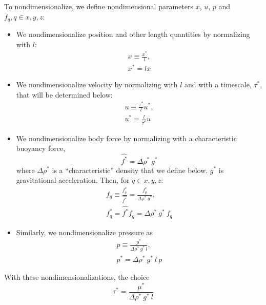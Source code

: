 \documentclass[10pt,a4paper]{article}
\def\non{\nonumber}
\def\l{\mathit{l}}
\begin{document}
To nondimensionalize, we define nondimensional parameters $x$, $u$, $p$ and $f_q, q \in x, y, z$:
\begin{itemize}
	\item We nondimensionalize position and other length quantities by normalizing with $l$:
	\begin{eqnarray}
		x \equiv \frac{x^*}{\mathit{l}} , \non \\
		x^* = \mathit{l} x 
	\end{eqnarray} 
	\item We nondimensionalize velocity by normalizing with $l$ and with a timescale, $\tau^*$, that will be determined below:
	\begin{eqnarray}\label{uscale}
		u \equiv \frac{\tau^*}{l} u^* , \non \\
		u^* = \frac{\mathit{l}}{\tau^*} u 
	\end{eqnarray} 
	\item We nondimensionalize body force by normalizing with a characteristic buoyancy force,
	\begin{equation}\label{charforce}
		\hat{f^*} = \Delta \rho^* ~ g^*
	\end{equation}
	where $\Delta \rho^*$ is a ``characteristic'' density that we define below. 
	$g^*$ is gravitational acceleration.
	Then, for $q \in x, y, z$:
	\begin{eqnarray}
		f_q \equiv \frac{f_q^*}{\hat{f^*}}  = \frac{f_q^*}{\Delta \rho^* ~ g^*} , \non \\
		f_q^* = \hat{f^*} f_q = \Delta \rho^* ~ g^* ~ f_q
	\end{eqnarray} 
	\item Similarly, we nondimensionalize pressure as
	\begin{eqnarray}
		p \equiv  \frac{ p^*}{\Delta \rho^* ~ g^* ~ l} , \non \\
		p^* = \Delta \rho^* ~ g^* ~ l ~ p  
	\end{eqnarray} 
\end{itemize}
With these nondimensionalizations, the choice 
\begin{equation}\label{tau_def}
	\tau^* = \frac{\mu^*}{\Delta \rho^* ~ g^* ~ l}
\end{equation}
\end{document}
